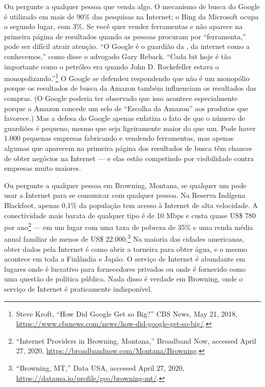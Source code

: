 Ou pergunte a qualquer pessoa que venda algo. O mecanismo de busca do Google é utilizado
em mais de 90\% das pesquisas na Internet; o Bing da Microsoft ocupa o segundo lugar, com
3\%. Se você quer vender ferramentas e não aparece na primeira página de resultados
quando as pessoas procuram por ``ferramenta,'' pode ser difícil atrair atenção. ``O
Google é o guardião da , da internet como a conhecemos,'' como
disse o advogado Gary Reback. ``Cada bit hoje é tão importante como o petróleo era quando
John D. Rockefeller estava o monopolizando.''\footnote{Steve Kroft, ``How Did Google Get
so Big?'' CBS News, May 21, 2018, \url{https://www.cbsnews.com/news/how-did-google-get-so-big/}.}
O Google se defendeu respondendo que não é um monopólio porque os resultados de busca da
Amazon também influenciam os resultados das compras. (O Google poderia ter observado que
isso acontece especialmente porque a Amazon concede um selo de ``Escolha da Amazon'' aos
produtos que favorece.) Mas a defesa do Google apenas enfatiza o fato de que o número de
guardiões é pequeno, mesmo que seja ligeiramente maior do que um. Pode haver 1.000 pequenas
empresas fabricando e vendendo ferramentas, mas apenas algumas que aparecem na primeira
página dos resultados de busca têm chances de obter negócios na Internet --- e elas estão
competindo por visibilidade contra empresas muito maiores.

Ou pergunte a qualquer pessoa em Browning, Montana, se qualquer um pode usar a Internet
para se comunicar com qualquer pessoa. Na Reserva Indígena Blackfoot, apenas 0,1\% da
população tem acesso à Internet de alta velocidade. A conectividade mais barata de
qualquer tipo é de 10 Mbps e custa quase US\$ 780 por ano\footnote{``Internet Providers
in Browning, Montana,'' Broadband Now, accessed April 27, 2020, \url{https://broadbandnow.com/Montana/Browning}.}
--- em um lugar com uma taxa de pobreza de 35\% e uma renda média anual familiar de menos
de US\$ 22.000.\footnote{``Browning, MT,'' Data USA, accessed April 27, 2020,
\url{https://datausa.io/profile/geo/browning-mt/}.} Na maioria das cidades americanas,
obter dados pela Internet é como abrir a torneira para obter água, e o mesmo acontece em
toda a Finlândia e Japão. O serviço de Internet é abundante em lugares onde é lucrativo
para fornecedores privados ou onde é fornecido como uma questão de política pública. Nada
disso é verdade em Browning, onde o serviço de Internet é praticamente indisponível.

